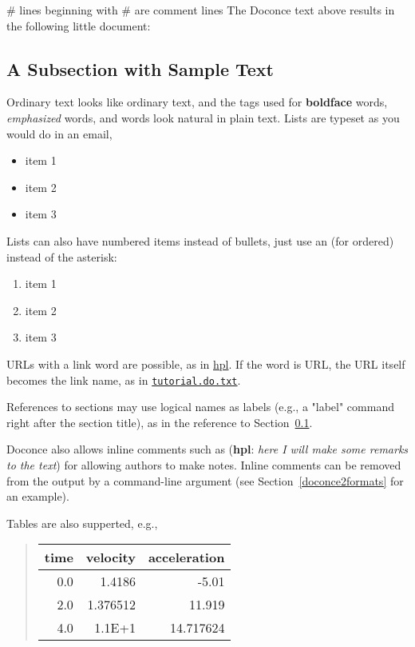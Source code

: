 \documentclass{book}
\newcommand{\inlinecomment}[2]{  ({\bf #1}: \emph{#2})  }
\begin{document}
# lines beginning with # are comment lines
\eccq
The Doconce text above results in the following little document:

\subsection{A Subsection with Sample Text}

\label{my:first:sec}

Ordinary text looks like ordinary text, and the tags used for
\textbf{boldface} words, \emph{emphasized} words, and  words look
natural in plain text.  Lists are typeset as you would do in an email,

\begin{itemize}
  \item item 1

  \item item 2

  \item item 3
\end{itemize}

\noindent
Lists can also have numbered items instead of bullets, just use an 
(for ordered) instead of the asterisk:

\begin{enumerate}
 \item item 1

 \item item 2

 \item item 3
\end{enumerate}

\noindent
URLs with a link word are possible, as in \href{{http://folk.uio.no/hpl}}{hpl}.
If the word is URL, the URL itself becomes the link name,
as in \href{{tutorial.do.txt}}{\nolinkurl{tutorial.do.txt}}.

References to sections may use logical names as labels (e.g., a
"label" command right after the section title), as in the reference to
Section~\ref{my:first:sec}.

Doconce also allows inline comments such as \inlinecomment{hpl}{here I will make
some remarks to the text} for allowing authors to make notes. Inline
comments can be removed from the output by a command-line argument
(see Section~\ref{doconce2formats} for an example).

Tables are also supperted, e.g.,


\begin{quote}\begin{tabular}{rrr}
\hline
\multicolumn{1}{c}{time} & \multicolumn{1}{c}{velocity} & \multicolumn{1}{c}{acceleration} \\
\hline
0.0          & 1.4186       & -5.01        \\
2.0          & 1.376512     & 11.919       \\
4.0          & 1.1E+1       & 14.717624    \\
\hline
\end{tabular}\end{quote}
\end{document}
